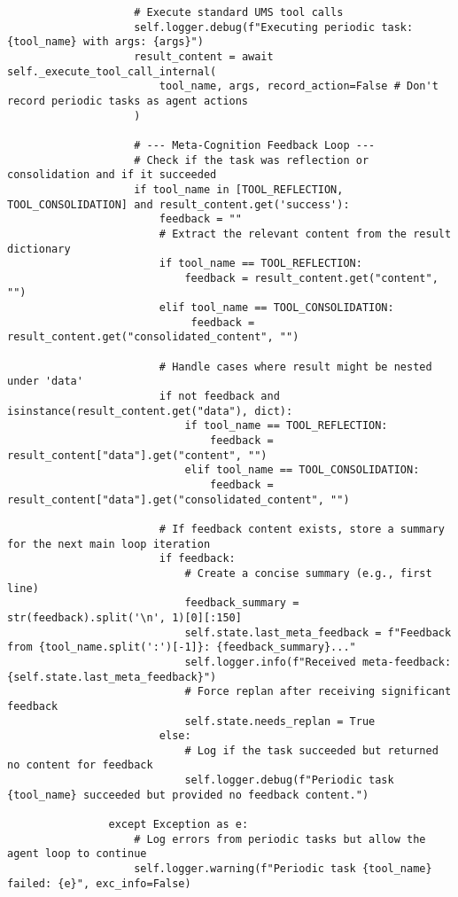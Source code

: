 \documentclass[12pt,a4paper]{article}
\begin{document}
\begin{pageablecode}
\begin{verbatim}
                    # Execute standard UMS tool calls
                    self.logger.debug(f"Executing periodic task: {tool_name} with args: {args}")
                    result_content = await self._execute_tool_call_internal(
                        tool_name, args, record_action=False # Don't record periodic tasks as agent actions
                    )

                    # --- Meta-Cognition Feedback Loop ---
                    # Check if the task was reflection or consolidation and if it succeeded
                    if tool_name in [TOOL_REFLECTION, TOOL_CONSOLIDATION] and result_content.get('success'):
                        feedback = ""
                        # Extract the relevant content from the result dictionary
                        if tool_name == TOOL_REFLECTION:
                            feedback = result_content.get("content", "")
                        elif tool_name == TOOL_CONSOLIDATION:
                             feedback = result_content.get("consolidated_content", "")

                        # Handle cases where result might be nested under 'data'
                        if not feedback and isinstance(result_content.get("data"), dict):
                            if tool_name == TOOL_REFLECTION:
                                feedback = result_content["data"].get("content", "")
                            elif tool_name == TOOL_CONSOLIDATION:
                                feedback = result_content["data"].get("consolidated_content", "")

                        # If feedback content exists, store a summary for the next main loop iteration
                        if feedback:
                            # Create a concise summary (e.g., first line)
                            feedback_summary = str(feedback).split('\n', 1)[0][:150]
                            self.state.last_meta_feedback = f"Feedback from {tool_name.split(':')[-1]}: {feedback_summary}..."
                            self.logger.info(f"Received meta-feedback: {self.state.last_meta_feedback}")
                            # Force replan after receiving significant feedback
                            self.state.needs_replan = True
                        else:
                            # Log if the task succeeded but returned no content for feedback
                            self.logger.debug(f"Periodic task {tool_name} succeeded but provided no feedback content.")

                except Exception as e:
                    # Log errors from periodic tasks but allow the agent loop to continue
                    self.logger.warning(f"Periodic task {tool_name} failed: {e}", exc_info=False)


\end{verbatim}
\end{pageablecode}
\end{document}

